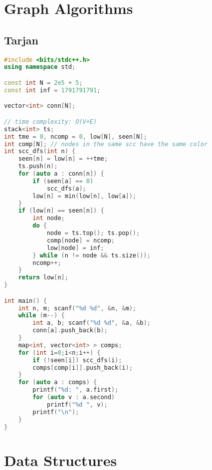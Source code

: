 \documentclass{article}
\begin{document}
\section{Graph Algorithms}
\subsection{Tarjan}
\begin{lstlisting}[language=C++]
#include <bits/stdc++.h>
using namespace std;

const int N = 2e5 + 5;
const int inf = 1791791791;

vector<int> conn[N];

// time complexity: O(V+E)
stack<int> ts;
int tme = 0, ncomp = 0, low[N], seen[N];
int comp[N]; // nodes in the same scc have the same color
int scc_dfs(int n) {
	seen[n] = low[n] = ++tme;
	ts.push(n);
	for (auto a : conn[n]) {
		if (seen[a] == 0)
			scc_dfs(a);
		low[n] = min(low[n], low[a]);
	}
	if (low[n] == seen[n]) {
		int node;
		do {
			node = ts.top(); ts.pop();
			comp[node] = ncomp;
			low[node] = inf;
		} while (n != node && ts.size());
		ncomp++;
	}
	return low[n];
}

int main() {
	int n, m; scanf("%d %d", &n, &m);
	while (m--) {
		int a, b; scanf("%d %d", &a, &b);	
		conn[a].push_back(b);
	}
	map<int, vector<int> > comps;
	for (int i=0;i<n;i++) {
		if (!seen[i]) scc_dfs(i);
		comps[comp[i]].push_back(i);
	}
	for (auto a : comps) {
		printf("%d: ", a.first);
		for (auto v : a.second)
			printf("%d ", v);
		printf("\n");
	}
}
\end{lstlisting}
\section{Data Structures}
\end{document}
